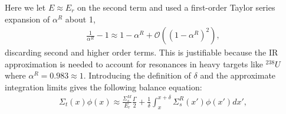 Here we let $E \approx E_r$ on the second term and used a first-order Taylor series expansion of $\alpha^R$ about 1,
\begin{align}
  \frac{1}{\alpha^R} - 1 \approx 1 - \alpha^R + \mathcal{O}\left( (1-\alpha^R)^2 \right),
\end{align}
discarding second and higher order terms. This is justifiable because the IR approximation is needed to account for resonances in heavy targets like $^{238}U$ where $\alpha^R = 0.983 \approx 1$. Introducing the definition of $\delta$ and the approximate integration limits gives the following balance equation:
\begin{align}
  \Sigma_t(x) \phi(x)  \approx \frac{\Sigma_s^M}{E_r} \frac{\Gamma}{2}
  + \frac{1}{\delta} \int_x^{x+\delta} \Sigma_s^R(x') \phi(x') dx',
\end{align}

